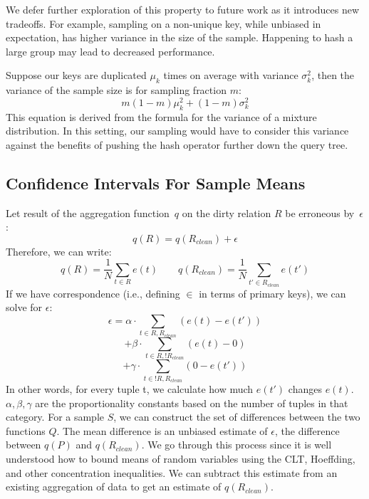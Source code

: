 We defer further exploration of this property to future work as it introduces new tradeoffs.
For example, sampling on a non-unique key, while unbiased in expectation, has higher variance in the size of the sample.
Happening to hash a large group may lead to decreased performance. 

Suppose our keys are duplicated $\mu_k$ times on average with variance $\sigma_k^2$, then the variance of the
sample size is for sampling fraction $m$:
\[m(1-m)\mu_k^2+(1-m)\sigma_k^2\]
This equation is derived from the formula for the variance of a mixture distribution.
In this setting, our sampling would have to consider this variance against the benefits of pushing the hash operator further down the query tree. 

\subsection{Confidence Intervals For Sample Means}
Let result of the aggregation function~$q$ on the dirty relation $R$ be erroneous by~$\epsilon$:
\[q(R) = q(R_{clean}) + \epsilon\]
Therefore, we can write:
\begin{equation}
q(R) = \frac{1}{N}\sum_{t\in R}e(t)\hspace{2em}
q(R_{clean}) = \frac{1}{N}\sum_{t'\in R_{clean}} e(t')
\end{equation}
If we have correspondence (i.e., defining $\in$ in terms of primary keys), we can solve for $\epsilon$:
\[
\epsilon = \alpha \cdot \sum_{t\in R, R_{clean}} (e(t)-e(t'))
\] 
\[+ \beta \cdot \sum_{t\in R, !R_{clean}}(e(t)-0) \]
\[+ \gamma \cdot \sum_{t\in ! R, R_{clean}}(0-e(t'))\] 
In other words, for every tuple t, we calculate how much $e(t')$ changes $e(t)$.
$\alpha, \beta, \gamma$ are the proportionality constants based on the number of tuples
in that category.
For a sample $S$, we can construct the set of differences between the two functions $Q$.
The mean difference is an unbiased estimate of $\epsilon$, the difference between $q(P)$ and $q(R_{clean})$.
We go through this process since it is well understood how to bound means of random variables using the CLT, Hoeffding, and other concentration inequalities.
We can subtract this estimate from an existing aggregation of data to get an estimate of $q(R_{clean})$.

